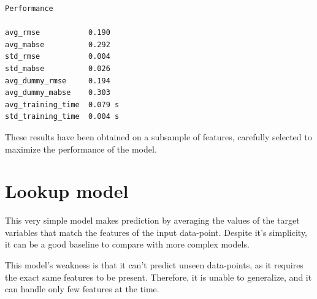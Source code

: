\documentclass[
]{article}
\begin{document}
\begin{verbatim}
Performance

avg_rmse           0.190
avg_mabse          0.292
std_rmse           0.004
std_mabse          0.026
avg_dummy_rmse     0.194
avg_dummy_mabse    0.303
avg_training_time  0.079 s
std_training_time  0.004 s
\end{verbatim}

These results have been obtained on a subsample of features, carefully
selected to maximize the performance of the model.

\section{Lookup model}\label{lookup-model}

This very simple model makes prediction by averaging the values of the
target variables that match the features of the input data-point.
Despite it's simplicity, it can be a good baseline to compare with more
complex models.

This model's weakness is that it can't predict unseen data-points, as it
requires the exact same features to be present. Therefore, it is unable
to generalize, and it can handle only few features at the time.
\end{document}
